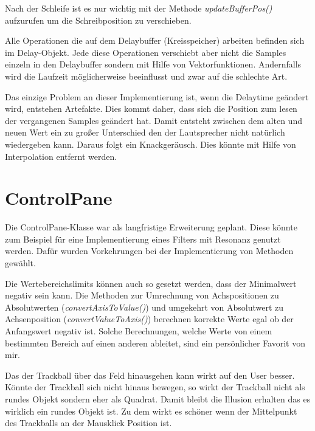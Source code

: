 Nach der Schleife ist es nur wichtig mit der Methode \textit{updateBufferPos()} aufzurufen um die Schreibposition zu verschieben.

Alle Operationen die auf dem Delaybuffer (Kreisspeicher) arbeiten befinden sich im Delay-Objekt. Jede diese Operationen verschiebt aber nicht die Samples einzeln in den Delaybuffer sondern mit Hilfe von Vektorfunktionen. Andernfalls wird die Laufzeit möglicherweise beeinflusst und zwar auf die schlechte Art.

Das einzige Problem an dieser Implementierung ist, wenn die Delaytime geändert wird, entstehen Artefakte. Dies kommt daher, dass sich die Position zum lesen der vergangenen Samples geändert hat. Damit entsteht zwischen dem alten und  neuen Wert ein zu großer Unterschied den der Lautsprecher nicht natürlich wiedergeben kann. Daraus folgt ein Knackgeräusch. Dies könnte mit Hilfe von Interpolation entfernt werden.

\section{ControlPane}

Die ControlPane-Klasse war als langfristige Erweiterung geplant. Diese könnte zum Beispiel für eine Implementierung eines Filters mit Resonanz genutzt werden. Dafür wurden Vorkehrungen bei der Implementierung von Methoden gewählt.

Die Wertebereichslimits können auch so gesetzt werden, dass der Minimalwert negativ sein kann. Die Methoden zur Umrechnung von Achspositionen zu Absolutwerten (\textit{convertAxisToValue()}) und umgekehrt von Absolutwert zu Achsenposition (\textit{convertValueToAxis()}) berechnen korrekte Werte egal ob der Anfangswert negativ ist. Solche Berechnungen, welche Werte von einem bestimmten Bereich auf einen anderen ableitet, sind ein persönlicher Favorit von mir. 

Das der Trackball über das Feld hinausgehen kann wirkt auf den User besser. Könnte der Trackball sich nicht hinaus bewegen, so wirkt der Trackball nicht als rundes Objekt sondern eher als Quadrat. Damit bleibt die Illusion erhalten das es wirklich ein rundes Objekt ist. Zu dem wirkt es schöner wenn der Mittelpunkt des Trackballs an der Mausklick Position ist.